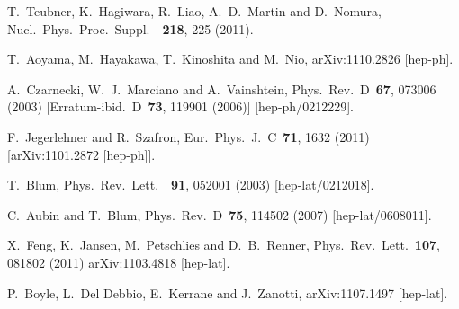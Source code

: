 \begin{thebibliography}{99}
  T.~Teubner, K.~Hagiwara, R.~Liao, A.~D.~Martin and D.~Nomura,
  Nucl.\ Phys.\ Proc.\ Suppl.\ \ {\bf 218}, 225  (2011).

  T.~Aoyama, M.~Hayakawa, T.~Kinoshita and M.~Nio,
  arXiv:1110.2826 [hep-ph].

  A.~Czarnecki, W.~J.~Marciano and A.~Vainshtein,
  Phys.\ Rev.\ D\ {\bf 67}, 073006  (2003)
  [Erratum-ibid.\ D\ {\bf 73}, 119901  (2006)]
  [hep-ph/0212229].

  F.~Jegerlehner and R.~Szafron,
  Eur.\ Phys.\ J.\ C\ {\bf 71}, 1632  (2011)
  [arXiv:1101.2872 [hep-ph]].

  T.~Blum,
  Phys.\ Rev.\ Lett.\ \ {\bf 91}, 052001  (2003)
  [hep-lat/0212018].

  C.~Aubin and T.~Blum,
  Phys.\ Rev.\ D\ {\bf 75}, 114502  (2007)
  [hep-lat/0608011].

  X.~Feng, K.~Jansen, M.~Petschlies and D.~B.~Renner,
  Phys.\ Rev.\ Lett.\ {\bf 107}, 081802  (2011) 
  arXiv:1103.4818 [hep-lat].

  P.~Boyle, L.~Del Debbio, E.~Kerrane and J.~Zanotti,
  arXiv:1107.1497 [hep-lat].
  

\end{thebibliography}
